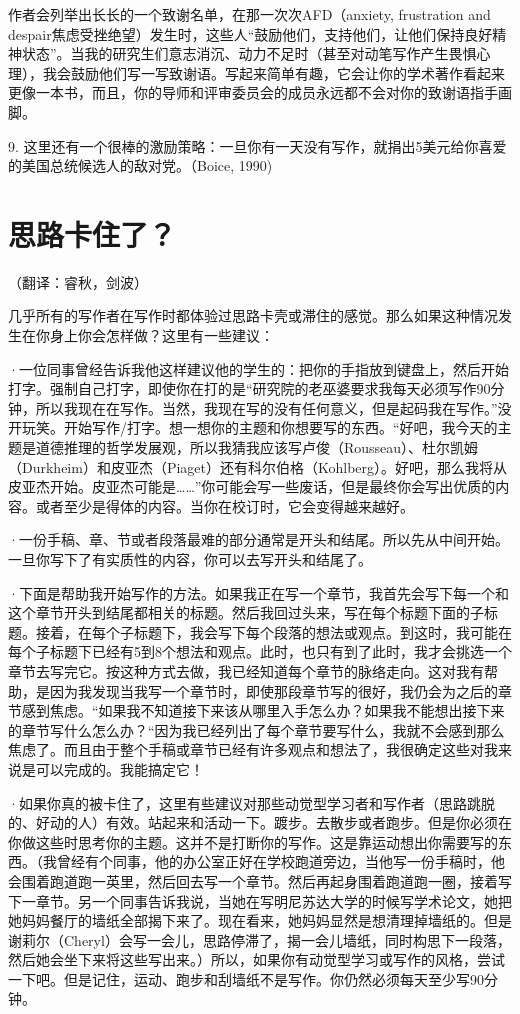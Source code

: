 \documentclass{ctexart}
\begin{document}
作者会列举出长长的一个致谢名单，在那一次次AFD（anxiety, frustration and despair焦虑受挫绝望）发生时，这些人“鼓励他们，支持他们，让他们保持良好精神状态”。当我的研究生们意志消沉、动力不足时（甚至对动笔写作产生畏惧心理），我会鼓励他们写一写致谢语。写起来简单有趣，它会让你的学术著作看起来更像一本书，而且，你的导师和评审委员会的成员永远都不会对你的致谢语指手画脚。

9. 这里还有一个很棒的激励策略：一旦你有一天没有写作，就捐出5美元给你喜爱的美国总统候选人的敌对党。（Boice, 1990)

\section{思路卡住了？}
（翻译：睿秋，剑波）

几乎所有的写作者在写作时都体验过思路卡壳或滞住的感觉。那么如果这种情况发生在你身上你会怎样做？这里有一些建议：

·一位同事曾经告诉我他这样建议他的学生的：把你的手指放到键盘上，然后开始打字。强制自己打字，即使你在打的是“研究院的老巫婆要求我每天必须写作90分钟，所以我现在在写作。当然，我现在写的没有任何意义，但是起码我在写作。”没开玩笑。开始写作/打字。想一想你的主题和你想要写的东西。“好吧，我今天的主题是道德推理的哲学发展观，所以我猜我应该写卢俊（Rousseau）、杜尔凯姆（Durkheim）和皮亚杰（Piaget）还有科尔伯格（Kohlberg）。好吧，那么我将从皮亚杰开始。皮亚杰可能是……”你可能会写一些废话，但是最终你会写出优质的内容。或者至少是得体的内容。当你在校订时，它会变得越来越好。

·一份手稿、章、节或者段落最难的部分通常是开头和结尾。所以先从中间开始。一旦你写下了有实质性的内容，你可以去写开头和结尾了。

·下面是帮助我开始写作的方法。如果我正在写一个章节，我首先会写下每一个和这个章节开头到结尾都相关的标题。然后我回过头来，写在每个标题下面的子标题。接着，在每个子标题下，我会写下每个段落的想法或观点。到这时，我可能在每个子标题下已经有5到8个想法和观点。此时，也只有到了此时，我才会挑选一个章节去写完它。按这种方式去做，我已经知道每个章节的脉络走向。这对我有帮助，是因为我发现当我写一个章节时，即使那段章节写的很好，我仍会为之后的章节感到焦虑。“如果我不知道接下来该从哪里入手怎么办？如果我不能想出接下来的章节写什么怎么办？“因为我已经列出了每个章节要写什么，我就不会感到那么焦虑了。而且由于整个手稿或章节已经有许多观点和想法了，我很确定这些对我来说是可以完成的。我能搞定它！

·如果你真的被卡住了，这里有些建议对那些动觉型学习者和写作者（思路跳脱的、好动的人）有效。站起来和活动一下。踱步。去散步或者跑步。但是你必须在你做这些时思考你的主题。这并不是打断你的写作。这是靠运动想出你需要写的东西。（我曾经有个同事，他的办公室正好在学校跑道旁边，当他写一份手稿时，他会围着跑道跑一英里，然后回去写一个章节。然后再起身围着跑道跑一圈，接着写下一章节。另一个同事告诉我说，当她在写明尼苏达大学的时候写学术论文，她把她妈妈餐厅的墙纸全部揭下来了。现在看来，她妈妈显然是想清理掉墙纸的。但是谢莉尔（Cheryl）会写一会儿，思路停滞了，揭一会儿墙纸，同时构思下一段落，然后她会坐下来将这些写出来。）所以，如果你有动觉型学习或写作的风格，尝试一下吧。但是记住，运动、跑步和刮墙纸不是写作。你仍然必须每天至少写90分钟。
\end{document}
